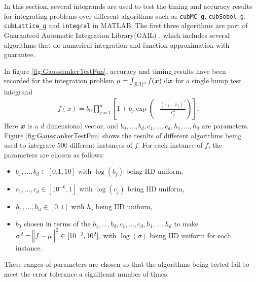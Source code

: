 \documentclass{iitthesis}
\begin{document}
\label{sec:cubmcgnumericalexample}
In this section, several integrands are used to test the timing and accuracy results for integrating problems over different algorithms such as {\tt cubMC\_g}, {\tt cubSobol\_g}, {\tt cubLattice\_g} and {\tt integral} in MATLAB, The first three algorithms are part of Guaranteed Automatic Integration Library(GAIL) \cite{GAIL_1_3}, which includes several algorithms that do numerical integration and function approximation with guarantee.

In figure \ref{fig:GaussiankerTestFun}, accuracy and timing results have been recorded for the integration problem 
$\mu=\int_{[0,1]^d} f(\vx) \, \dif \vx$ for a single hump test integrand
\begin{align}\label{GaussiankerTestFun}
f(x) = b_0\prod_{j=1}^d\left[ 1 +b_j \exp \left(-\frac{(x_j-h_j)^2}{c_j^2}\right) \right].
\end{align}
Here $\boldsymbol{x}$ is a $d$ dimensional vector, and $ b_0, \ldots, b_d, c_1, \ldots, c_d, h_1, \ldots, h_d$ are parameters. Figure \ref{fig:GaussiankerTestFun} shows the results of different algorithms being used to integrate 500 different instances of $f$.  For each instance of $f$, the parameters are chosen as follows:
\begin{itemize} 
\item $b_1, \ldots, b_d \in [0.1,10]$ with $\log(b_j)$ being IID uniform,
\item $c_1, \ldots, c_d \in [10^{-6},1]$ with $\log(c_j)$ being IID uniform,
\item $h_1, \ldots, h_d \in [0,1]$ with $h_j$ being IID uniform,
\item $b_0$ chosen in terms of the $b_1, \ldots, b_d, c_1, \ldots, c_d, h_1, \ldots, h_d$ to make $\sigma^2 =\norm[2]{f-\mu}^2 \in [10^{-2}, 10^2]$, with $\log(\sigma)$ being IID uniform for each instance.
\end{itemize}
These ranges of parameters are chosen so that the algorithms being tested fail to meet the error tolerance a significant number of times.
\end{document}
